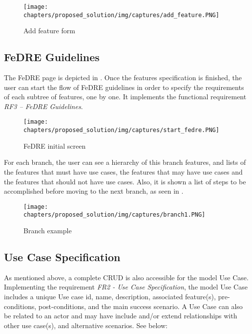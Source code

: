 \begin{figure}[htp]
\begin{center}
  \texttt{[image: chapters/proposed\_solution/img/captures/add\_feature.PNG]}
  \caption[Add feature form]{Add feature form}
  \label{fg:add-feature}
\end{center}
\end{figure}

\subsection{FeDRE Guidelines}

The \ac{FeDRE} page is depicted in . Once the features
specification is finished, the user can start the flow of \ac{FeDRE} guidelines in order to specify the requirements of each subtree of features, 
one by one. It implements the functional requirement \textit{RF3 – FeDRE
Guidelines}.

\begin{figure}[htp]
\begin{center}
  \texttt{[image: chapters/proposed\_solution/img/captures/start\_fedre.PNG]}
  \caption[FeDRE initial screen]{FeDRE initial screen}
  \label{fg:start-fedre}
\end{center}
\end{figure}

For each branch, the user can see a hierarchy of this branch features, and lists of the features that 
must have use cases, the features that may have use cases and the features that should not have use cases. 
Also, it is shown a list of steps to be accomplished before moving to the next
branch, as seen in .

\begin{figure}[htp]
\begin{center}
  \texttt{[image: chapters/proposed\_solution/img/captures/branch1.PNG]}
  \caption[Branch example]{Branch example}
  \label{fg:branch1}
\end{center}
\end{figure}

\subsection{Use Case Specification}

As mentioned above, a complete \ac{CRUD} is also accessible for the model Use
Case.
Implementing the requirement \textit{FR2 - Use Case Specification}, the model
Use Case includes a unique Use case id,  name,  description, associated feature(s), pre-conditions, 
post-conditions, 
and the main success scenario. A Use Case can also be related to an actor and may have include and/or 
extend relationships with other use case(s), and alternative scenarios. See
 below:


